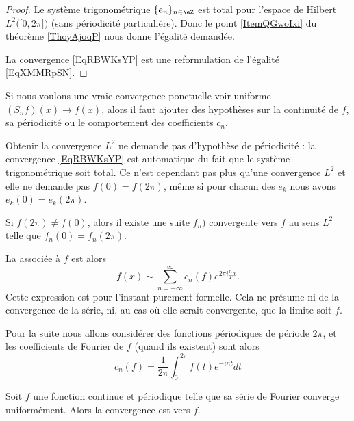 \begin{proof}
    Le système trigonométrique \( \{ e_n \}_{n\in \eZ}\) est total pour l'espace de Hilbert \( L^2\big( \mathopen[ 0 , 2\pi \mathclose] \big)\) (sans périodicité particulière). Donc le point \ref{ItemQGwoIxi} du théorème \ref{ThoyAjoqP} nous donne l'égalité demandée.

    La convergence \ref{EqRBWKsYP} est une reformulation de l'égalité \eqref{EqXMMRpSN}.
\end{proof}

Si nous voulons une vraie convergence ponctuelle voir uniforme \( (S_nf)(x)\to f(x)\), alors il faut ajouter des hypothèses sur la continuité de \( f\), sa périodicité ou le comportement des coefficients \( c_n\).

\begin{remark}
    Obtenir la convergence \( L^2\) ne demande pas d'hypothèse de périodicité : la convergence \eqref{EqRBWKsYP} est automatique du fait que le système trigonométrique soit total. Ce n'est cependant pas plus qu'une convergence \( L^2\) et elle ne demande pas \( f(0)=f(2\pi)\), même si pour chacun des \( e_k\) nous avons \( e_k(0)=e_k(2\pi)\).

    Si \( f(2\pi)\neq f(0)\), alors il existe une suite \( f_n)\) convergente vers \( f\) au sens \( L^2\) telle que \( f_n(0)=f_n(2\pi)\).
\end{remark}

La  associée à \( f\) est alors
\begin{equation}
    f(x)\sim\sum_{n=-\infty}^{\infty}c_n(f) e^{2\pi i\frac{ n }{ T }x}.
\end{equation}
Cette expression est pour l'instant purement formelle. Cela ne présume ni de la convergence de la série, ni, au cas où elle serait convergente, que la limite soit \( f\).

Pour la suite nous allons considérer des fonctions périodiques de période \( 2\pi\), et les coefficients de Fourier de \( f\) (quand ils existent) sont alors
\begin{equation}    \label{EqNDBaXRL}
    c_n(f)=\frac{1}{ 2\pi }\int_0^{2\pi}f(t) e^{-int}dt
\end{equation}

\begin{proposition}  \label{PropmrLfGt}
    Soit \( f\) une fonction continue et périodique telle que sa série de Fourier converge uniformément. Alors la convergence est vers \( f\).
\end{proposition}

